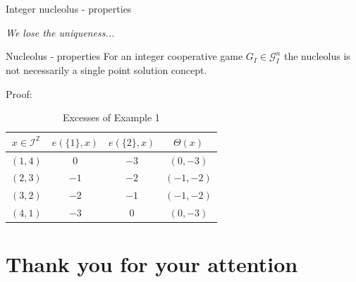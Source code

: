 \documentclass{beamer}
\newcommand{\Z}{\mathbb{Z}}
\begin{document}


\begin{frame}{Integer nucleolus - properties}
    \pause

    \textit{We lose the uniqueness...}

    \pause
    \begin{block}{Nucleolus - properties}
        \pause
        For an integer cooperative game $G_I \in \mathcal{G}_I^n$ the nucleolus is not necessarily a single point solution concept.
    \end{block}

    \pause

    Proof:

    \pause

\begin{table}[h]
    \caption{Excesses of Example 1}
    \label{fig:excesses_of_weber_set_example}
    \centering
    \begin{tabular}{|c||c|c||c|}
        \hline
        $x \in \mathcal{I}^{\Z}$ &  $e(\{1\}, x)$ & $e(\{2\},x)$ & $\Theta(x)$\\
        \hline
        \hline
        $(1,4)$ & $0$ & $-3$ & $(0,-3)$ \\
        $(2,3)$ & $-1$ & $-2$ & $(-1,-2)$ \\
        $(3,2)$ & $-2$ & $-1$ & $(-1,-2)$ \\
        $(4,1)$ & $-3$ & $0$ & $(0,-3)$ \\
        \hline
    \end{tabular}
\end{table}
\end{frame}




\section{Thank you for your attention}
\end{document}

